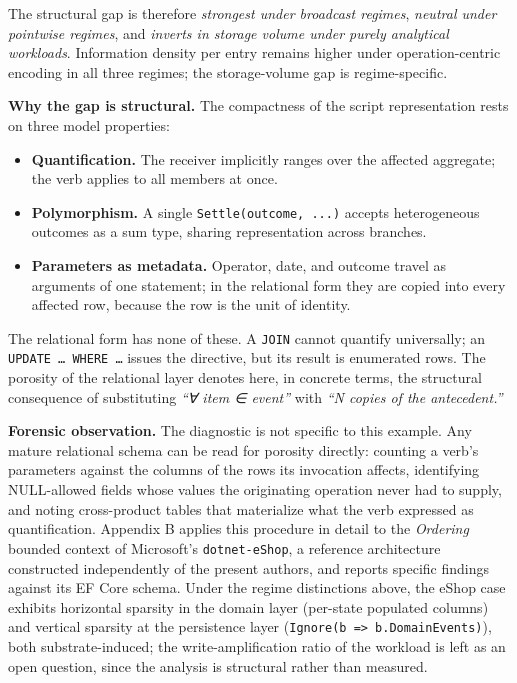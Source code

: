 \documentclass[
]{article}
\newcounter{none} %
\providecommand{\tightlist}{%
  \setlength{\itemsep}{0pt}\setlength{\parskip}{0pt}}
\let\origtexttt\texttt%
\renewcommand{\texttt}[1]{\origtexttt{\seqsplit{#1}}}%
\let\texttt\origtexttt%
\begin{document}
The structural gap is therefore \emph{strongest under broadcast
regimes}, \emph{neutral under pointwise regimes}, and \emph{inverts in
storage volume under purely analytical workloads}. Information density
per entry remains higher under operation-centric encoding in all three
regimes; the storage-volume gap is regime-specific.

\textbf{Why the gap is structural.} The compactness of the script
representation rests on three model properties:

\begin{itemize}
\tightlist
\item
  \textbf{Quantification.} The receiver implicitly ranges over the
  affected aggregate; the verb applies to all members at once.
\item
  \textbf{Polymorphism.} A single \texttt{Settle(outcome,\ ...)} accepts
  heterogeneous outcomes as a sum type, sharing representation across
  branches.
\item
  \textbf{Parameters as metadata.} Operator, date, and outcome travel as
  arguments of one statement; in the relational form they are copied
  into every affected row, because the row is the unit of identity.
\end{itemize}

The relational form has none of these. A \texttt{JOIN} cannot quantify
universally; an \texttt{UPDATE\ …\ WHERE\ …} issues the directive, but
its result is enumerated rows. The porosity of the relational layer
denotes here, in concrete terms, the structural consequence of
substituting \emph{``∀ item ∈ event''} with \emph{``N copies of the
antecedent.''}

\textbf{Forensic observation.} The diagnostic is not specific to this
example. Any mature relational schema can be read for porosity directly:
counting a verb's parameters against the columns of the rows its
invocation affects, identifying NULL-allowed fields whose values the
originating operation never had to supply, and noting cross-product
tables that materialize what the verb expressed as quantification.
Appendix B applies this procedure in detail to the \emph{Ordering}
bounded context of Microsoft's \texttt{dotnet-eShop}, a reference
architecture constructed independently of the present authors, and
reports specific findings against its EF Core schema. Under the regime
distinctions above, the eShop case exhibits horizontal sparsity in the
domain layer (per-state populated columns) and vertical sparsity at the
persistence layer (\texttt{Ignore(b\ =\textgreater{}\ b.DomainEvents)}),
both substrate-induced; the write-amplification ratio of the workload is
left as an open question, since the analysis is structural rather than
measured.
\end{document}
